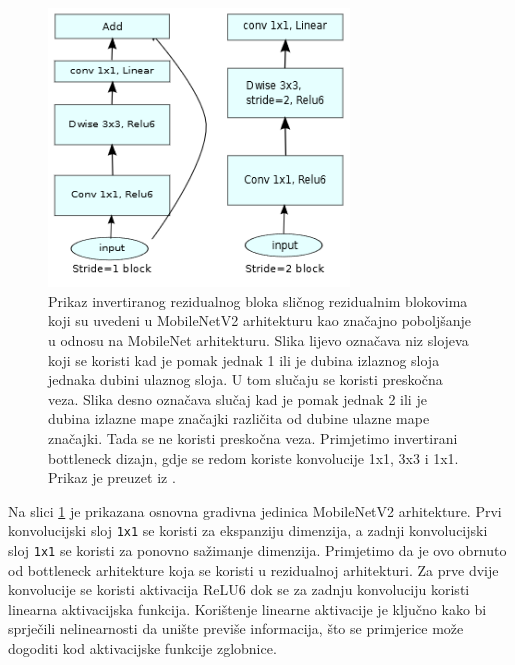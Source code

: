 \documentclass[times, utf8, diplomski,  numeric]{fer}
\begin{document}
\begin{figure}[htb]
\centering
\includegraphics[width=8cm]{./images/mnv2}
\caption{Prikaz invertiranog rezidualnog bloka sličnog rezidualnim blokovima koji su uvedeni u MobileNetV2 arhitekturu kao značajno poboljšanje u odnosu na MobileNet arhitekturu. Slika lijevo označava niz slojeva koji se koristi kad je pomak jednak 1 ili je dubina izlaznog sloja jednaka dubini ulaznog sloja. U tom slučaju se koristi preskočna veza. Slika desno označava slučaj kad je pomak jednak 2 ili je dubina izlazne mape značajki različita od dubine ulazne mape značajki. Tada se ne koristi preskočna veza.  Primjetimo invertirani bottleneck dizajn, gdje se redom koriste konvolucije 1x1, 3x3 i 1x1. Prikaz je preuzet iz \cite{mobilenetv2}.}
\label{fig:mobnetv2}
\end{figure}\par
Na slici \ref{fig:mobnetv2} je prikazana osnovna gradivna jedinica MobileNetV2 arhitekture. Prvi konvolucijski sloj \verb|1x1| se koristi za ekspanziju dimenzija, a zadnji konvolucijski sloj \verb|1x1| se koristi za ponovno sažimanje dimenzija. Primjetimo da je ovo obrnuto od bottleneck arhitekture koja se koristi u rezidualnoj arhitekturi. Za prve dvije konvolucije se koristi aktivacija ReLU6 dok se za zadnju konvoluciju koristi linearna aktivacijska funkcija. Korištenje linearne aktivacije je ključno kako bi sprječili nelinearnosti da unište previše informacija, što se primjerice može dogoditi kod aktivacijske funkcije zglobnice.
\end{document}
